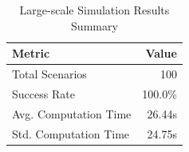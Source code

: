 \begin{table}[h]
\centering
\caption{Large-scale Simulation Results Summary}
\label{tab:simulation_results}
\begin{tabular}{lr}
\hline
\textbf{Metric} & \textbf{Value} \\
\hline
Total Scenarios & 100 \\
Success Rate & 100.0\% \\
Avg. Computation Time & 26.44s \\
Std. Computation Time & 24.75s \\
\hline
\end{tabular}
\end{table}
